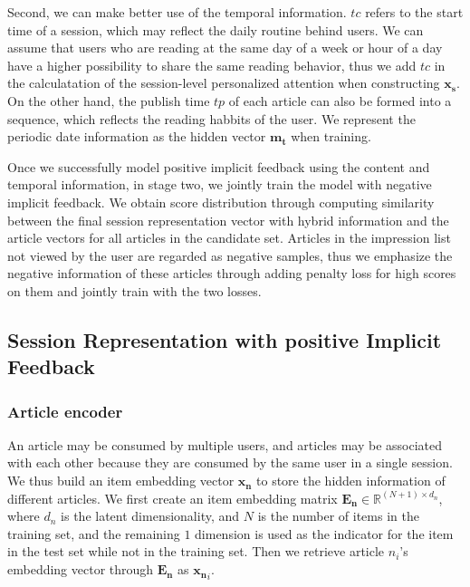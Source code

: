 Second, we can make better use of the temporal information. 
$tc$ refers to the start time of a session, which may reflect the daily routine behind users. We can assume that users who are reading at the same day of a week or hour of a day have a higher possibility to share the same reading behavior, 
thus we add $tc$ in the calculatation of the session-level personalized attention when 
constructing $\mathbf{x_s}$. 
On the other hand, the publish time $tp$ of each article can also be 
formed into a sequence, which reflects the reading habbits of the user. 
We represent the periodic date information as the hidden vector 
$\mathbf{m_t}$ when training.

Once we successfully model positive implicit feedback using the content and temporal information, in stage two, we jointly train the model with negative implicit feedback. We obtain score distribution through computing similarity between the final session representation vector with hybrid information and the article vectors for all articles in the candidate set. Articles in the impression list not viewed by the user are regarded 
as negative samples, thus we emphasize the negative information of these articles 
through adding penalty loss for high scores on them and jointly train with  the two losses.

\subsection{Session Representation with positive Implicit Feedback}
\label{sec:positive feedback}

\subsubsection{Article encoder}

An article may be consumed by multiple users, and articles may be associated
with each other because they are consumed by the same user in a single session.
We thus build an item embedding vector $\mathbf{x_n}$ to store the hidden information 
of different articles. We first create an item embedding matrix 
$\mathbf{E_n}\in \mathbb{R}^{(N+1)\times d_n}$, 
where $d_n$ is the latent dimensionality, and $N$ is the number of items in the 
training set, and the remaining $1$ dimension is used as the indicator for the item in the test set while not in the training set. Then we retrieve article $n_i$'s embedding vector through $\mathbf{E_n}$ as $\mathbf{x_n}_i$.

